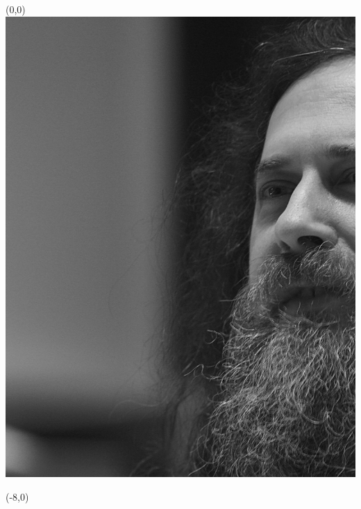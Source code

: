 \documentclass[
	\ifnum\noemptypages=1 open=any,\fi parskip=half, chapterprefix=true, captions=oneline, fontsize=10pt]{scrbook}
\begin{document}
\sloppy


\ifnum{}
	\begin{titlepage}
		\ifnum{}
			\addtolength{\topmargin}{2em}
		\else
			\addtolength{\topmargin}{-2em}
		\fi

		
		\ifnum{}
			\begin{textblock}{11}(0,0)
				\includegraphics[width=\textwidth]{rms.jpg}
			\end{textblock}
		\else
			\begin{textblock}{11}(-8,0)

\end{textblock}
\end{titlepage}
\end{document}
